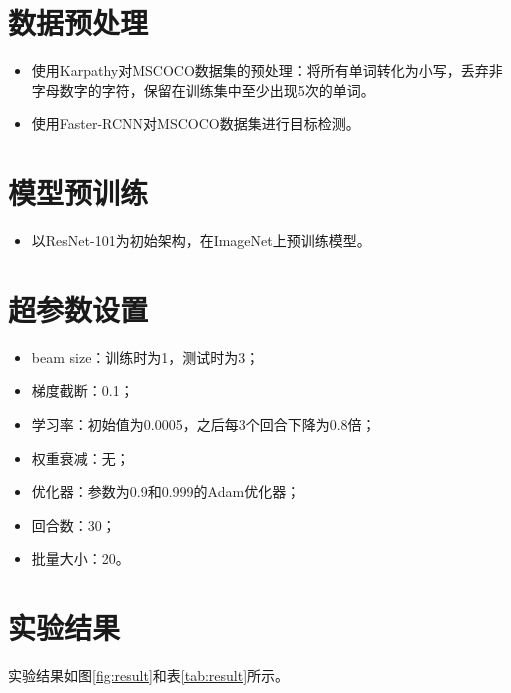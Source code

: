 \documentclass[12pt]{article}
\begin{document}
\section{数据预处理}

\begin{itemize}
\item 使用Karpathy对MSCOCO数据集的预处理：将所有单词转化为小写，丢弃非字母数字的字符，保留在训练集中至少出现5次的单词。
\item 使用Faster-RCNN对MSCOCO数据集进行目标检测。
\end{itemize}

\section{模型预训练}

\begin{itemize}
\item 以ResNet-101为初始架构，在ImageNet上预训练模型。
\end{itemize}

\section{超参数设置}

\begin{itemize}
\item beam size：训练时为1，测试时为3；
\item 梯度截断：0.1；
\item 学习率：初始值为0.0005，之后每3个回合下降为0.8倍；
\item 权重衰减：无；
\item 优化器：参数为0.9和0.999的Adam优化器；
\item 回合数：30；
\item 批量大小：20。
\end{itemize}

\section{实验结果}

实验结果如图\ref{fig:result}和表\ref{tab:result}所示。
\end{document}
